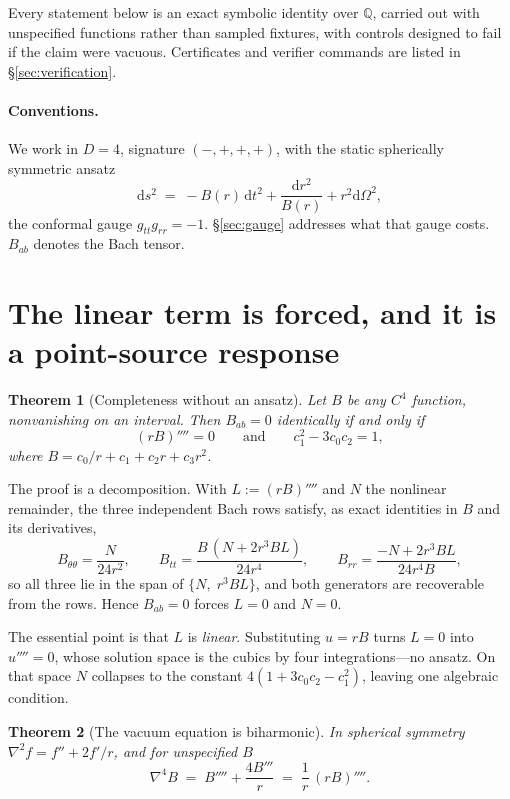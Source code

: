\documentclass[11pt]{article}
\newtheorem{theorem}{Theorem}[section]
\theoremstyle{definition}
\theoremstyle{remark}
\newcommand{\dd}{\mathrm d}
\begin{document}
Every statement below is an exact symbolic identity over \(\mathbb{Q}\),
carried out with unspecified functions rather than sampled fixtures, with
controls designed to fail if the claim were vacuous.  Certificates and
verifier commands are listed in \S\ref{sec:verification}.

\paragraph{Conventions.}
We work in \(D=4\), signature \((-,+,+,+)\), with the static spherically
symmetric ansatz
\[
  \dd s^{2} \;=\; -B(r)\,\dd t^{2} + \frac{\dd r^{2}}{B(r)}
  + r^{2}\dd\Omega^{2},
\]
the conformal gauge \(g_{tt}g_{rr}=-1\).  \S\ref{sec:gauge} addresses what
that gauge costs.  \(B_{ab}\) denotes the Bach tensor.

\section{The linear term is forced, and it is a point-source response}
\label{sec:forced}

\begin{theorem}[Completeness without an ansatz]
\label{thm:complete}
Let \(B\) be any \(C^{4}\) function, nonvanishing on an interval.  Then
\(B_{ab}=0\) identically if and only if
\[
  (rB)'''' = 0
  \qquad\text{and}\qquad
  c_{1}^{2}-3c_{0}c_{2}=1,
\]
where \(B=c_{0}/r+c_{1}+c_{2}r+c_{3}r^{2}\).
\end{theorem}

The proof is a decomposition.  With \(L:=(rB)''''\) and \(N\) the nonlinear
remainder, the three independent Bach rows satisfy, as exact identities in
\(B\) and its derivatives,
\[
  B_{\theta\theta}=\frac{N}{24r^{2}},\qquad
  B_{tt}=\frac{B\,(N+2r^{3}BL)}{24r^{4}},\qquad
  B_{rr}=\frac{-N+2r^{3}BL}{24r^{4}B},
\]
so all three lie in the span of \(\{N,\;r^{3}BL\}\), and both generators are
recoverable from the rows.  Hence \(B_{ab}=0\) forces \(L=0\) and \(N=0\).

The essential point is that \(L\) is \emph{linear}.  Substituting \(u=rB\)
turns \(L=0\) into \(u''''=0\), whose solution space is the cubics by four
integrations---no ansatz.  On that space \(N\) collapses to the constant
\(4(1+3c_{0}c_{2}-c_{1}^{2})\), leaving one algebraic condition.

\begin{theorem}[The vacuum equation is biharmonic]
\label{thm:biharm}
In spherical symmetry \(\nabla^{2}f=f''+2f'/r\), and for unspecified \(B\)
\[
  \nabla^{4}B \;=\; B''''+\frac{4B'''}{r} \;=\; \frac{1}{r}\,(rB)''''.
\]
\end{theorem}
\end{document}
